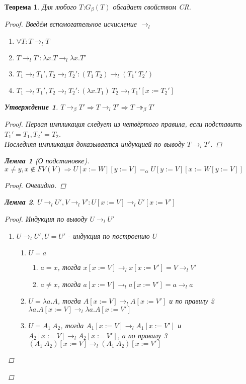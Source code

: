 \documentclass[10pt,twoside]{article}
\theoremstyle{plain}
\newtheorem{thm}{Теорема}
\newtheorem{lemma}{Лемма}
\newtheorem*{ass*}{Утверждение}
\theoremstyle{definition}
\begin{document}
\begin{thm}
  Для любого $T$:$G_\beta(T)$ обладает свойством CR.
  \begin{proof}
    Введём вспомогательное исчисление $\to_l$
    \begin{enumerate}
      \item $\forall T:T\to_l T$
      \item $T\to_l T':\lambda x.T\to_l\lambda x.T'$
      \item $T_1\to_l T_1',T_2\to_l T_2':(T_1\ T_2)\to_l (T_1'\ T_2')$
      \item $T_1\to_l T_1',T_2\to_l T_2':(\lambda x.T_1)\ T_2\to_l T_1'[x:=T_2']$
    \end{enumerate}
    \begin{ass*}
      $T\to_\beta T' \Rightarrow T \to_l T' \Rightarrow T\twoheadrightarrow_\beta T'$
      \begin{proof}
        Первая импликация следует из четвёртого правила, если подставить $T_1'=T_1,T_2'=T_2$.\\
        Последняя импликация доказывается индукцией по выводу $T \to_l T'$.
      \end{proof}
    \end{ass*}
    \begin{lemma}[О подстановке]
      $x\neq y, x\notin FV(V) \Rightarrow U[x:=W][y:=V] =_\alpha U[y:=V][x:=W[y:=V]]$
      \begin{proof}
        Очевидно.
      \end{proof}
    \end{lemma}
    \begin{lemma}
      $U\to_l U',V\to_l V':U[x:=V]\to_l U'[x:=V']$
      \begin{proof}
        Индукция по выводу $U\to_l U'$
        \begin{enumerate}
          \item $U \to_l U',U = U'$ - индукция по построению $U$
          \begin{enumerate}
            \item $U=a$
              \begin{enumerate}
                \item $a=x$, тогда $x[x:=V] \to_l x[x:=V'] = V\to_l V'$
                \item $a\neq x$, тогда $a[x:=V] \to_l a[x:=V'] = a\to_l a$
              \end{enumerate}
            \item $U=\lambda a.A$, тогда $A[x:=V] \to_l A[x:=V']$ и по правилу 2 $\lambda a.A[x:=V]\to_l \lambda a.A[x:=V']$
            \item $U=A_1\ A_2$, тогда $A_1[x:=V] \to_l A_1[x:=V']$ и $A_2[x:=V] \to_l A_2[x:=V']$, а по правилу 3 $(A_1\ A_2)[x:=V]\to_l (A_1\ A_2)[x:=V']$
          \end{enumerate}


\end{enumerate}
\end{proof}
\end{lemma}
\end{proof}
\end{thm}
\end{document}
